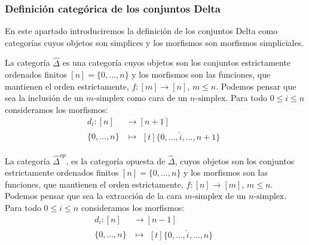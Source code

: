 \documentclass[../main.tex]{subfiles}
\begin{document}
\subsubsection{Definici\'on categ\'orica de los conjuntos Delta}
En este apartado introduciremos la definici\'on de los conjuntos Delta como categor\'ias cuyos objetos son simplices y los morfismos son morfismos simpliciales.
\begin{defi}
    La categor\'ia $\hat{\Delta}$ es una categor\'ia cuyos objetos son los conjuntos estrictamente ordenados finitos $[n] = \{0,\dots,n\}$ y los morfismos son las funciones, que mantienen el orden estrictamente, $f\colon [m] \to [n]$, $m\le n$. Podemos pensar que sea la inclusi\'on de un $m\text{-simplex}$ como cara de un $n\text{-simplex}$.
    Para todo $0\le i \le n$ consideramos los morfismos:
    \begin{align*}
        d_i: [n]      & \longrightarrow [n+1] \\
        \{0,\dots,n\} & \longmapsto\!
        \begin{aligned}[t]
            \{0,\dots, \hat{i}, \dots,n+1\}
        \end{aligned}
    \end{align*}
\end{defi}

\begin{defi}
    La categor\'ia $\hat{\Delta}^{op}$, es la categor\'ia opuesta de $\hat{\Delta}$, cuyos objetos son los conjuntos estrictamente ordenados finitos $[n] = \{0,\dots,n\}$ y los morfismos son las funciones, que mantienen el orden estrictamente, $f: [n] \longrightarrow [m]$, $m\le n$. Podemos pensar que sea la extracci\'on de la cara $m\text{-simplex}$ de un $n\text{-simplex}$.
    Para todo $0\le i \le n$ consideramos los morfismos:
    \begin{align*}
        d_i: [n]      & \longrightarrow [n-1] \\
        \{0,\dots,n\} & \longmapsto\!
        \begin{aligned}[t]
            \{0,\dots, \hat{i}, \dots,n\}
        \end{aligned}
    \end{align*}
\end{defi}
\end{document}
